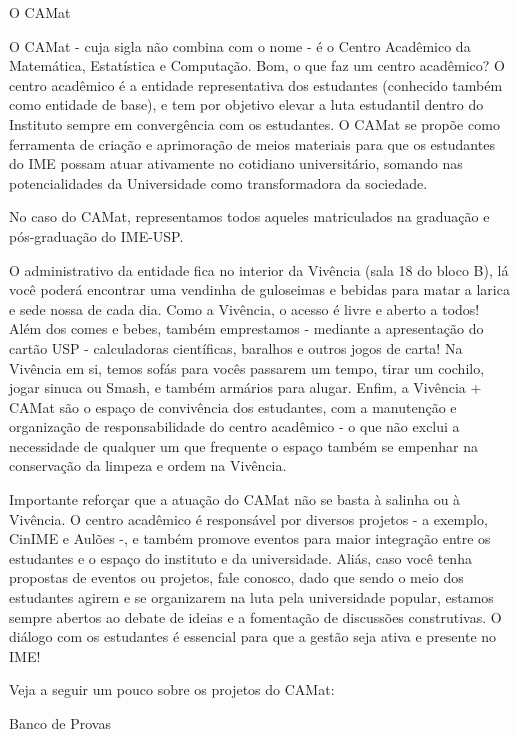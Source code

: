 \begin{secao}{O CAMat}

O CAMat - cuja sigla não combina com o nome - é o Centro Acadêmico da
Matemática, Estatística e Computação. Bom, o que faz um centro acadêmico? 
O centro acadêmico é a entidade representativa dos estudantes (conhecido 
também como entidade de base), e tem por objetivo elevar a luta estudantil 
dentro do Instituto sempre em convergência com os estudantes. O CAMat se 
propõe como ferramenta de criação e aprimoração de meios materiais para que 
os estudantes do IME possam atuar ativamente no cotidiano universitário, 
somando nas potencialidades da Universidade como transformadora da sociedade. 

No caso do CAMat, representamos todos aqueles matriculados na graduação e pós-graduação do IME-USP.

O administrativo da entidade fica no interior da Vivência (sala 18 do bloco B), lá você 
poderá encontrar uma vendinha de guloseimas e bebidas para matar a larica e sede nossa de
cada dia. Como a Vivência,  o acesso é livre e aberto a todos! Além dos
comes e bebes, também emprestamos - mediante a apresentação do cartão USP -
calculadoras científicas, baralhos e outros jogos de carta! Na Vivência em si, temos sofás
para vocês passarem um tempo, tirar um cochilo, jogar sinuca ou Smash, e
também armários para alugar. Enfim, a Vivência + CAMat são o espaço de convivência 
dos estudantes, com a manutenção e organização de responsabilidade do centro acadêmico 
- o que não exclui a necessidade de qualquer um que frequente o espaço também se 
empenhar na conservação da limpeza e ordem na Vivência.

Importante reforçar que a atuação do CAMat não se basta à salinha ou à Vivência. 
O centro acadêmico é responsável por diversos projetos - a exemplo, CinIME e Aulões 
-, e também promove eventos para maior integração entre os estudantes e o espaço do 
instituto e da universidade. Aliás, caso você tenha propostas de eventos ou projetos, 
fale conosco, dado que sendo o meio dos estudantes agirem e se organizarem na luta pela 
universidade popular, estamos sempre abertos ao debate de ideias e a fomentação de discussões 
construtivas. O diálogo com os estudantes é essencial para que a gestão seja ativa e presente no IME!

Veja a seguir um pouco sobre os projetos do CAMat:


\begin{subsecao}{Banco de Provas}


\end{subsecao}
\end{secao}
